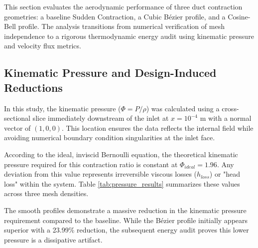 \documentclass[12pt, a4paper]{article}
\begin{document}
This section evaluates the aerodynamic performance of three duct contraction geometries: a baseline Sudden Contraction, a Cubic Bézier profile, and a Cosine-Bell profile. The analysis transitions from numerical verification of mesh independence to a rigorous thermodynamic energy audit using kinematic pressure and velocity flux metrics.

\subsection{Kinematic Pressure and Design-Induced Reductions}
In this study, the kinematic pressure ($\Phi = P/\rho$) was calculated using a cross-sectional slice immediately downstream of the inlet at $x = 10^{-4}$ m with a normal vector of $(1, 0, 0)$. This location ensures the data reflects the internal field while avoiding numerical boundary condition singularities at the inlet face. 

According to the ideal, inviscid Bernoulli equation, the theoretical kinematic pressure required for this contraction ratio is constant at $\Phi_{ideal} = 1.96$. Any deviation from this value represents irreversible viscous losses ($h_{loss}$) or "head loss" within the system. Table \ref{tab:pressure_results} summarizes these values across three mesh densities.

\begin{table}[H]
	\centering
	\caption{Kinematic Pressure ($\Phi$), Viscous Losses ($h_{loss}$), and Percentage Reductions Relative to Sudden Contraction}
	\label{tab:pressure_results}
\end{table}

The smooth profiles demonstrate a massive reduction in the kinematic pressure requirement compared to the baseline. While the Bézier profile initially appears superior with a 23.99\% reduction, the subsequent energy audit proves this lower pressure is a dissipative artifact.
\end{document}
